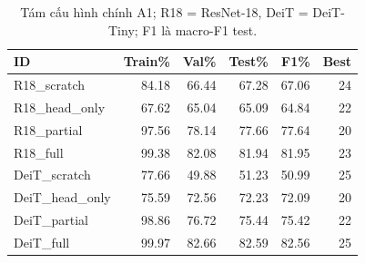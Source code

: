 \begin{table}[htbp]
\centering\small
\caption{Tám cấu hình chính A1; R18 = ResNet-18, DeiT = DeiT-Tiny; F1 là macro-F1 test.}\label{tab:A1results}
\begin{lrbox}{\reporttable}\begin{tabular}{lrrrrr}
\toprule
ID & Train\% & Val\% & Test\% & F1\% & Best \\
\midrule
R18\_scratch & 84.18 & 66.44 & 67.28 & 67.06 & 24 \\
R18\_head\_only & 67.62 & 65.04 & 65.09 & 64.84 & 22 \\
R18\_partial & 97.56 & 78.14 & 77.66 & 77.64 & 20 \\
R18\_full & 99.38 & 82.08 & 81.94 & 81.95 & 23 \\
DeiT\_scratch & 77.66 & 49.88 & 51.23 & 50.99 & 25 \\
DeiT\_head\_only & 75.59 & 72.56 & 72.23 & 72.09 & 20 \\
DeiT\_partial & 98.86 & 76.72 & 75.44 & 75.42 & 22 \\
DeiT\_full & 99.97 & 82.66 & 82.59 & 82.56 & 25 \\
\bottomrule
\end{tabular}\end{lrbox}
\ifdim\wd\reporttable>\linewidth\resizebox{\linewidth}{!}{\usebox{\reporttable}}\else\usebox{\reporttable}\fi
\end{table}
